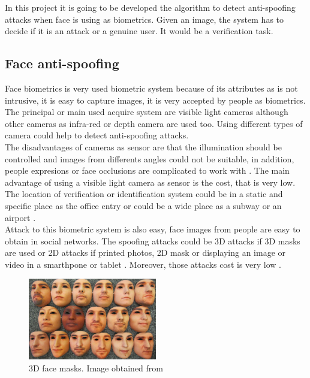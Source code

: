 In this project it is going to be developed the algorithm to detect anti-spoofing attacks when face is using as biometrics. Given an image, the system has to decide if it is an attack or a genuine user. It would be a verification task.\\

\subsection{Face anti-spoofing}
Face biometrics is very used biometric system because of its attributes as is not intrusive, it is easy to capture images, it is very accepted by people as biometrics. \\

The principal or main used acquire system are visible light cameras although other cameras as infra-red  or depth camera are used too. Using different types of camera could help to detect anti-spoofing attacks.\\

The disadvantages of cameras as sensor are that the illumination should be controlled and images from differents angles could not be suitable, in addition, people expresions or face occlusions are complicated to work with \cite{survey2,2d_3d_face}. The main advantage of using a visible light camera as sensor is the cost, that is very low. \\

The location of verification or identification system could be in a static and specific place as the office entry or could be a wide place as a subway or an airport \cite{survey2}.\\

Attack to this biometric system is also easy, face images from people are easy to obtain in social networks. The spoofing attacks could be 3D attacks if 3D masks are used or 2D attacks if printed photos, 2D mask or displaying an image or video in a smarthpone or tablet \cite{2d_3d_face}. Moreover, those attacks cost is very low \cite{distorsion}.\\ 

\begin{figure}[htb]
\centering
\includegraphics[width=0.5\textwidth]{images_miscelaneus/fig_masks.png}
\caption{3D face masks. Image obtained from \cite{3dmask}} \label{fig:3dMasks}
\end{figure}

